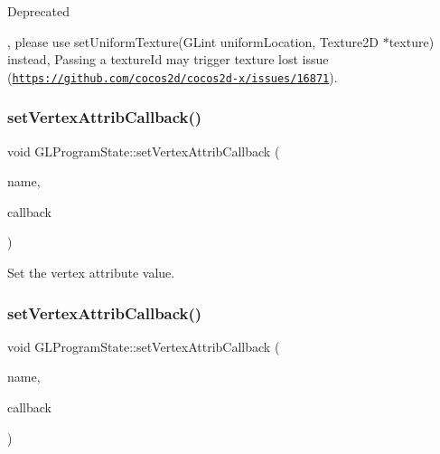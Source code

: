 \begin{DoxyRefDesc}{Deprecated}
\item[\hyperlink{deprecated__deprecated000367}{Deprecated}], please use set\+Uniform\+Texture(\+G\+Lint uniform\+Location, Texture2\+D $\ast$texture) instead, Passing a {\ttfamily texture\+Id} may trigger texture lost issue (\href{https://github.com/cocos2d/cocos2d-x/issues/16871}{\tt https\+://github.\+com/cocos2d/cocos2d-\/x/issues/16871}). \end{DoxyRefDesc}
\mbox{\label{classGLProgramState_a2b0daf0548df92f03a1c42807f5aaab0}} 
\subsubsection{\texorpdfstring{set\+Vertex\+Attrib\+Callback()}{setVertexAttribCallback()}\hspace{0.1cm}{\footnotesize\ttfamily [1/2]}}
{\footnotesize\ttfamily void G\+L\+Program\+State\+::set\+Vertex\+Attrib\+Callback (\begin{DoxyParamCaption}\item[{const std\+::string \&}]{name,  }\item[{const std\+::function$<$ void(\hyperlink{structVertexAttrib}{Vertex\+Attrib} $\ast$)$>$ \&}]{callback }\end{DoxyParamCaption})}

Set the vertex attribute value. \mbox{\label{classGLProgramState_a2b0daf0548df92f03a1c42807f5aaab0}} 
\subsubsection{\texorpdfstring{set\+Vertex\+Attrib\+Callback()}{setVertexAttribCallback()}\hspace{0.1cm}{\footnotesize\ttfamily [2/2]}}
{\footnotesize\ttfamily void G\+L\+Program\+State\+::set\+Vertex\+Attrib\+Callback (\begin{DoxyParamCaption}\item[{const std\+::string \&}]{name,  }\item[{const std\+::function$<$ void(\hyperlink{structVertexAttrib}{Vertex\+Attrib} $\ast$)$>$ \&}]{callback }\end{DoxyParamCaption})}

